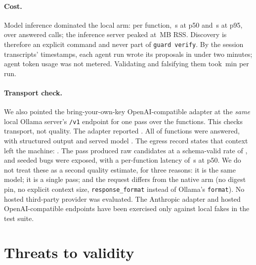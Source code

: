 \documentclass[10pt,twocolumn]{article}
\begin{document}
\paragraph{Cost.}
Model inference dominated the local arm: per function, \ModelLatPfifty\,s at p50 and \ModelLatPninetyfive\,s at p95,
over \ModelCalls{} answered calls; the inference server peaked at \ModelRss\,MB RSS. Discovery is therefore an explicit
command and never part of \texttt{guard verify}. By the session transcripts' timestamps, each agent run wrote its proposals in under two minutes; agent
token usage was not metered. Validating and falsifying them took \AgentFalsificationMin\,min per run.

\paragraph{Transport check.}
We also pointed the bring-your-own-key OpenAI-compatible adapter at the \emph{same} local Ollama server's \texttt{/v1}
endpoint for one pass over the \ModelFunctions{} functions. This checks transport, not quality. The adapter reported
\TransportStatus{}. All \TransportAnswered{} of \TransportFunctions{} functions were answered, with structured output
\TransportStructured{} and served model \TransportServed{}. The egress record states that context left the machine:
\TransportLeft. The pass produced \TransportRaw{} raw candidates at a schema-valid rate of \TransportSchemaRate{}, and
\TransportExposed{} seeded bugs were exposed, with a per-function latency of \TransportLatPfifty\,s at p50. We do not
treat these as a second quality estimate, for three reasons: it is the same model; it is a single pass; and the request
differs from the native arm (no digest pin, no explicit context size, \texttt{response\_format} instead of Ollama's
\texttt{format}). No hosted third-party provider was evaluated. The Anthropic adapter and hosted OpenAI-compatible
endpoints have been exercised only against local fakes in the test suite.

\section{Threats to validity}
\label{sec:threats}
\end{document}

